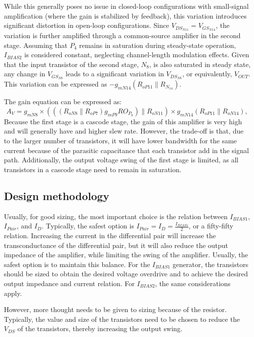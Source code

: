 \documentclass[12pt]{article}
\begin{document}
While this generally poses no issue in closed-loop configurations with small-signal amplification (where the gain is stabilized by feedback), this variation introduces significant distortion in open-loop configurations. Since $V_{DS_{N11}} = V_{GS_{N14}}$, the variation is further amplified through a common-source amplifier in the second stage. Assuming that $P_4$ remains in saturation during steady-state operation, $I_{BIAS2}$ is considered constant, neglecting channel-length modulation effects. Given that the input transistor of the second stage, $N_8$, is also saturated in steady state, any change in $V_{GS_{N8}}$ leads to a significant variation in $V_{DS_{N8}}$, or equivalently, $V_{OUT}$. This variation can be expressed as $-g_{mN14}(R_{oP11} \parallel R_{N_{14}})$. 

The gain equation can be expressed as: \[ A_{V} = g_{mN8} \times \left( ((R_{oN8} \parallel R_{oP7}) g_{mP9} RO_{P_{9}}) \parallel R_{oN11} \right) \times g_{mN14} (R_{oP11} \parallel R_{oN14}), \] Because the first stage is a cascode stage, the gain of this amplifier is very high and will generally have and higher slew rate. However, the trade-off is that, due to the larger number of transistors, it will have lower bandwidth for the same current because of the parasitic capacitance that each transistor add in the signal path. Additionally, the output voltage swing of the first stage is limited, as all transistors in a cascode stage need to remain in saturation.

\subsection{Design methodology}
Usually, for good sizing, the most important choice is the relation between $I_{BIAS1}$, $I_{Pair}$, and $I_D$. Typically, the safest option is $I_{Pair} = I_D = \frac{I_{BIAS1}}{2}$, or a fifty-fifty relation. Increasing the current in the differential pair will increase the transconductance of the differential pair, but it will also reduce the output impedance of the amplifier, while limiting the swing of the amplifier. Usually, the safest option is to maintain this balance. For the $I_{BIAS1}$ generator, the transistors should be sized to obtain the desired voltage overdrive and to achieve the desired output impedance and current relation. For $I_{BIAS2}$, the same considerations apply. 

However, more thought needs to be given to sizing because of the resistor. Typically, the value and size of the transistors need to be chosen to reduce the $V_{DS}$ of the transistors, thereby increasing the output swing.
\end{document}
